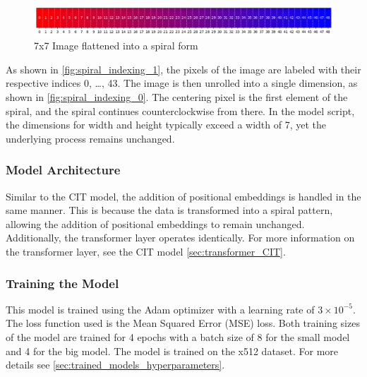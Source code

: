     \begin{figure}[H]
    \centering
    \includegraphics[width=1\textwidth]{../code/dataAnalysis/plots/exampleImgs/spiralShowcase0.png}
    \caption{7x7 Image flattened into a spiral form} 
    \label{fig:spiral_indexing_0}        
    \end{figure}

    As shown in \autoref{fig:spiral_indexing_1}, the pixels of the image are labeled with their respective indices 0, \dots, 43. The image is then unrolled into a single dimension, as shown in \autoref{fig:spiral_indexing_0}. The centering pixel is the first element of the spiral, and the spiral continues counterclockwise from there. In the model script, the dimensions for width and height typically exceed a width of 7, yet the underlying process remains unchanged.



\subsubsection{Model Architecture}

Similar to the CIT model, the addition of positional embeddings is handled in the same manner. This is because the data is transformed into a spiral pattern, allowing the addition of positional embeddings to remain unchanged. Additionally, the transformer layer operates identically. For more information on the transformer layer, see the CIT model \autoref{sec:transformer_CIT}.


\subsubsection{Training the Model}

This model is trained using the Adam optimizer with a learning rate of \(3 \times 10^{-5}\). The loss function used is the Mean Squared Error (MSE) loss. Both training sizes of the model are trained for 4 epochs with a batch size of 8 for the small model and 4 for the big model. The model is trained on the x512 dataset. For more details see \autoref{sec:trained_models_hyperparameters}.

